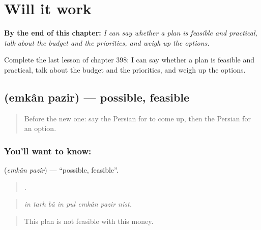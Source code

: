 
\chapter{Will it work}
\label{ch:fa-will-it-work}

\begin{chapteropening}
\textbf{By the end of this chapter:} \emph{I can say whether a plan is feasible and practical, talk about the budget and the priorities, and weigh up the options.}

Complete the last lesson of chapter 398: I can say whether a plan is feasible and practical, talk about the budget and the priorities, and weigh up the options.
\end{chapteropening}

\section[\texorpdfstring{\fa{امکان} \fa{پذیر} (emkân pazir)}{امکان پذیر (emkân pazir)}]{  (emkân pazir) — possible, feasible}

\label{lesson:FA-C398-emkan-pazir}



\begin{quote}
Before the new one: say the Persian for to come up, then the Persian for an option.
\end{quote}

\subsection*{You'll want to know:  }
\textbf{ } (\emph{emkân pazir}) — \textquotedblleft{}possible, feasible\textquotedblright{}.

\begin{quote}
       .
\end{quote}

\begin{quote}
\emph{in tarh bâ in pul emkân pazir nist.}
\end{quote}

\begin{quote}
This plan is not feasible with this money.
\end{quote}

